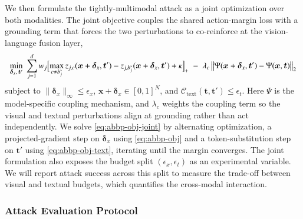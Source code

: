 \documentclass[11pt,letterpaper]{article}
\begin{document}
We then formulate the tightly-multimodal attack as a joint optimization over both modalities. 
The joint objective couples the shared action-margin loss with a grounding term that forces the two perturbations to co-reinforce at the vision-language fusion layer,
\vspace{-1.5ex}\begin{equation}
  \small
\min_{\bm{\delta}_x,\,\bm{t}'}\;\sum_{j=1}^{d} w_j
\Bigl[\max_{c\neq b_j^{*}} z_{j,c}(\bm{x}+\bm{\delta}_x,\bm{t}')-z_{j,b_j^{*}}(\bm{x}+\bm{\delta}_x,\bm{t}')+\kappa\Bigr]_{+}
\;-\;\lambda_c\,\bigl\|\Psi(\bm{x}+\bm{\delta}_x,\bm{t}')-\Psi(\bm{x},\bm{t})\bigr\|_{2}
\label{eq:abbp-obj-joint}
\vspace{-1.5ex}\end{equation}
subject to $\|\bm{\delta}_x\|_{\infty}\le\epsilon_x$, $\bm{x}+\bm{\delta}_x\in[0,1]^{N}$, and $\mathcal{C}_{\mathrm{text}}(\bm{t},\bm{t}')\le\epsilon_t$.
Here $\Psi$ is the model-specific coupling mechanism, %
and $\lambda_c$ weights the coupling term so the visual and textual perturbations align at grounding rather than act independently.
We solve \autoref{eq:abbp-obj-joint} by alternating optimization, \ie a projected-gradient step on $\bm{\delta}_x$ using \autoref{eq:abbp-obj} and a token-substitution step on $\bm{t}'$ using \autoref{eq:abbp-obj-text}, iterating until the margin converges.
The joint formulation also exposes the budget split $(\epsilon_x,\epsilon_t)$ as an experimental variable. We will report attack success across this split to measure the trade-off between visual and textual budgets, which quantifies the cross-modal interaction. %

 \subsubsection{Attack Evaluation Protocol}
\end{document}
